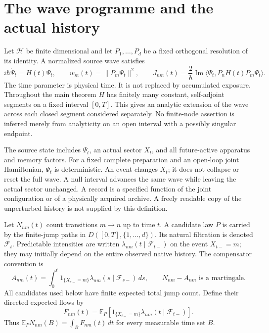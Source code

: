 \documentclass[11pt,oneside,openany]{book}
\theoremstyle{definition}
\theoremstyle{remark}\newtheorem{remark}[theorem]{Remark}
\begin{document}
\section{The wave programme and the actual history}

Let $\mathcal H$ be finite dimensional and let $P_1,\ldots,P_d$ be a fixed
orthogonal resolution of its identity. A normalized source wave satisfies
\begin{equation}\label{stat:schrodinger}
 i\hbar\dot\Psi_t=H(t)\Psi_t,
 \qquad w_m(t)=\|P_m\Psi_t\|^2,
 \qquad
 J_{nm}(t)=\frac{2}{\hbar}\operatorname{Im}
       \langle\Psi_t,P_nH(t)P_m\Psi_t\rangle.
\end{equation}
The time parameter is physical time. It is not replaced by accumulated
exposure. Throughout the main theorem $H$ has finitely many constant,
self-adjoint segments on a fixed interval $[0,T]$. This gives an analytic
extension of the wave across each closed segment considered separately.
No finite-node assertion is inferred merely from analyticity on an open
interval with a possibly singular endpoint.

The source state includes $\Psi_t$, an actual sector $X_t$, and all
future-active apparatus and memory factors. For a fixed complete preparation
and an open-loop joint Hamiltonian, $\Psi_t$ is deterministic. An event changes
$X_t$; it does not collapse or reset the full wave. A null interval advances
the same wave while leaving the actual sector unchanged. A record is a
specified function of the joint configuration or of a physically acquired
archive. A freely readable copy of the unperturbed history is not supplied
by this definition.

Let $N_{nm}(t)$ count transitions $m\to n$ up to time $t$. A candidate law
$P$ is carried by the finite-jump paths in
$D([0,T],\{1,\ldots,d\})$. Its natural filtration is denoted
$\mathcal F_t$. Predictable intensities are written
$\lambda_{nm}(t\mid\mathcal F_{t-})$ on the event $X_{t-}=m$; they may initially
depend on the entire observed native history. The compensator convention is
\begin{equation}\label{stat:compensator}
 A_{nm}(t)=\int_0^t 1_{\{X_{s-}=m\}}
       \lambda_{nm}(s\mid\mathcal F_{s-})\,ds,
 \qquad N_{nm}-A_{nm}\text{ is a martingale}.
\end{equation}
All candidates used below have finite expected total jump count. Define their
directed expected flows by
\begin{equation}\label{stat:mean-flow}
 F_{nm}(t)=\mathbb E_P\!\left[
   1_{\{X_{t-}=m\}}\lambda_{nm}(t\mid\mathcal F_{t-})\right].
\end{equation}
Thus $\mathbb E_P N_{nm}(B)=\int_B F_{nm}(t)\,dt$ for every measurable time
set $B$.
\end{document}
